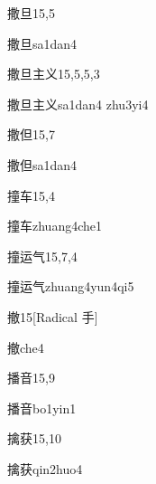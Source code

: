 \begin{entry}{撒旦}{15,5}
  \begin{phonetics}{撒旦}{sa1dan4}
  \end{phonetics}
\end{entry}

\begin{entry}{撒旦主义}{15,5,5,3}
  \begin{phonetics}{撒旦主义}{sa1dan4 zhu3yi4}
  \end{phonetics}
\end{entry}

\begin{entry}{撒但}{15,7}
  \begin{phonetics}{撒但}{sa1dan4}
  \end{phonetics}
\end{entry}

\begin{entry}{撞车}{15,4}
  \begin{phonetics}{撞车}{zhuang4che1}
  \end{phonetics}
\end{entry}

\begin{entry}{撞运气}{15,7,4}
  \begin{phonetics}{撞运气}{zhuang4yun4qi5}
  \end{phonetics}
\end{entry}

\begin{entry}{撤}{15}[Radical 手]
  \begin{phonetics}{撤}{che4}
  \end{phonetics}
\end{entry}

\begin{entry}{播音}{15,9}
  \begin{phonetics}{播音}{bo1yin1}
  \end{phonetics}
\end{entry}

\begin{entry}{擒获}{15,10}
  \begin{phonetics}{擒获}{qin2huo4}
  \end{phonetics}
\end{entry}

